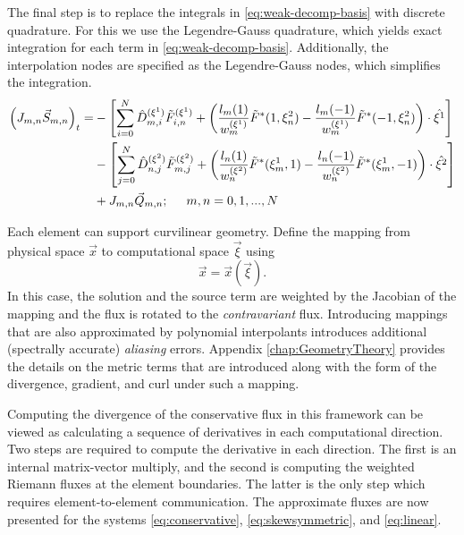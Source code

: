 \documentclass{softwaremanual}
\begin{document}
The final step is to replace the integrals in \eqref{eq:weak-decomp-basis} with discrete quadrature. For this we use the Legendre-Gauss quadrature, which yields exact integration for each term in \eqref{eq:weak-decomp-basis}. Additionally, the interpolation nodes are specified as the Legendre-Gauss nodes, which simplifies the integration.
 \begin{equation}
 \begin{split}
 \left( J_{m,n} \vec{S}_{m,n} \right)_t =  &-\left[\sum_{i=0}^{N}\hat{D}^{(\xi^1)}_{m,i} \tilde{F}^{(\xi^1)}_{i,n}   + \left( \frac{ l_m(1)}{w^{(\xi^1)}_m} \tilde{F}^{*}(1,\xi^2_n) - \frac{ l_m(-1)}{w^{(\xi^1)}_m} \tilde{F}^{*}(-1,\xi^2_n) \right) \cdot \hat{\xi^1} \right] \\
  &-\left[ \sum_{j=0}^{N}\hat{D}^{(\xi^2)}_{n,j} \tilde{F}^{(\xi^2)}_{m,j}  + \left( \frac{l_n(1)}{w^{(\xi^2)}_n} \tilde{F}^{*}(\xi^1_m,1)  -  \frac{l_n(-1)}{w^{(\xi^2)}_n} \tilde{F}^{*}(\xi^1_m,-1) \right)\cdot \hat{\xi^2}  \right] \\ 
 &+ J_{m,n}\vec{Q}_{m,n}; \hspace{5mm} m,n=0,1,...,N
\end{split} \label{eq:discrete2d_system} 
 \end{equation}

Each element can support curvilinear geometry. Define the mapping from physical space $\vec{x}$ to computational space $\vec{\xi}$ using
  \begin{equation}
  \vec{x} = \vec{x}(\vec{\xi}).\label{eq:mapping}
  \end{equation}
In this case, the solution and the source term are weighted by the Jacobian of the mapping and the flux is rotated to the \textit{contravariant} flux. Introducing mappings that are also approximated by polynomial interpolants introduces additional (spectrally accurate) \textit{aliasing} errors. Appendix \ref{chap:GeometryTheory} provides the details on the metric terms that are introduced along with the form of the divergence, gradient, and curl under such a mapping.

 Computing the divergence of the conservative flux in this framework can be viewed as calculating a sequence of derivatives in each computational direction. Two steps are required to compute the derivative in each direction. The first is an internal matrix-vector multiply, and the second is computing the weighted Riemann fluxes at the element boundaries. The latter is the only step which requires element-to-element communication. The approximate fluxes are now presented for the systems \eqref{eq:conservative}, \eqref{eq:skewsymmetric}, and \eqref{eq:linear}.
\end{document}
